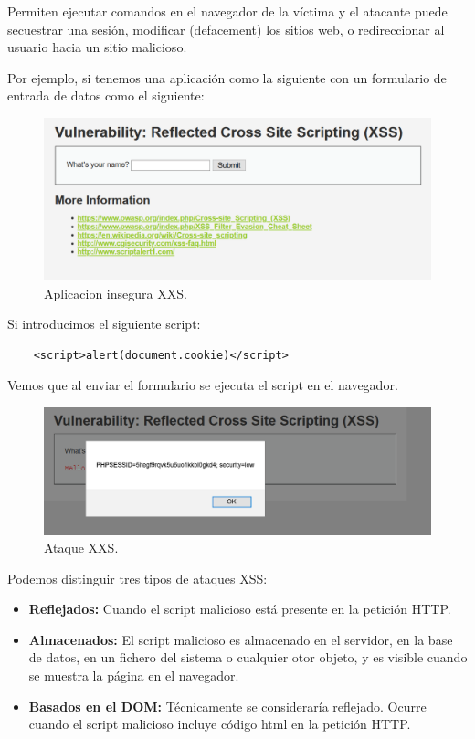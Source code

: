 Permiten ejecutar comandos en el navegador de la víctima y el atacante puede secuestrar una sesión, modificar (\gls{defacement}) los sitios web, o redireccionar al usuario hacia un sitio malicioso.

Por ejemplo, si tenemos una aplicación como la siguiente con un formulario de entrada de datos como el siguiente:

\begin{figure}[!htb]  
    \includegraphics[width=\linewidth]{./imagenes/016_XSS_1.png}
    \caption{Aplicacion insegura XXS.}  
    \label{fig:7 - Aplicacion insegura XXS.}
\end{figure}

Si introducimos el siguiente script:

\begin{verbatim}
    <script>alert(document.cookie)</script>
\end{verbatim}

Vemos que al enviar el formulario se ejecuta el script en el navegador.\\

\begin{figure}[!htb] 
    \centering
    \captionsetup{width=1\linewidth}   
    \includegraphics[width=\linewidth]{./imagenes/016_XSS_2.png}
    \caption{Ataque XXS.}  
    \label{fig:8 - Ataque XXS.}
\end{figure}

Podemos distinguir tres tipos de ataques XSS:\\
\begin{itemize}
    \item \textbf{Reflejados:} Cuando el script malicioso está presente en la petición HTTP.
    \item \textbf{Almacenados:} El script malicioso es almacenado en el servidor, en la base 
    de datos, en un fichero del sistema o cualquier otor objeto, y es visible cuando se muestra 
    la página en el navegador.
    \item \textbf{Basados en el DOM:} Técnicamente se consideraría reflejado. Ocurre cuando el script 
    malicioso incluye código html en la petición HTTP.
\end{itemize}

